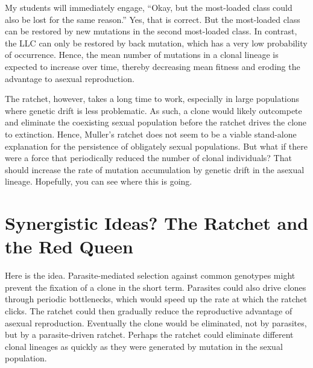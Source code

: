 \documentclass[
  letterpaper,
]{book}
\begin{document}
My students will immediately engage, ``Okay, but the most-loaded class
could also be lost for the same reason.'' Yes, that is correct. But the
most-loaded class can be restored by new mutations in the second
most-loaded class. In contrast, the LLC can only be restored by back
mutation, which has a very low probability of occurrence. Hence, the
mean number of mutations in a clonal lineage is expected to increase
over time, thereby decreasing mean fitness and eroding the advantage to
asexual reproduction.

The ratchet, however, takes a long time to work, especially in large
populations where genetic drift is less problematic. As such, a clone
would likely outcompete and eliminate the coexisting sexual population
before the ratchet drives the clone to extinction. Hence, Muller's
ratchet does not seem to be a viable stand-alone explanation for the
persistence of obligately sexual populations. But what if there were a
force that periodically reduced the number of clonal individuals? That
should increase the rate of mutation accumulation by genetic drift in
the asexual lineage. Hopefully, you can see where this is going.

\section{Synergistic Ideas? The Ratchet and the Red
Queen}\label{synergistic-ideas-the-ratchet-and-the-red-queen}

Here is the idea. Parasite-mediated selection against common genotypes
might prevent the fixation of a clone in the short term. Parasites could
also drive clones through periodic bottlenecks, which would speed up the
rate at which the ratchet clicks. The ratchet could then gradually
reduce the reproductive advantage of asexual reproduction. Eventually
the clone would be eliminated, not by parasites, but by a
parasite-driven ratchet. Perhaps the ratchet could eliminate different
clonal lineages as quickly as they were generated by mutation in the
sexual population.
\end{document}
